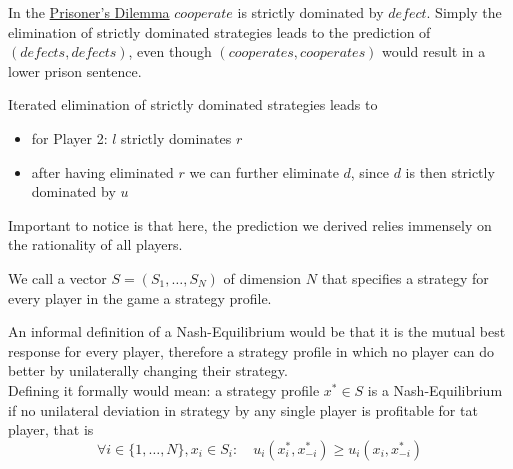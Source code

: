 In the \hyperref[prisonersdilemma]{Prisoner's Dilemma} $cooperate$ is strictly dominated by $defect$. Simply the elimination of strictly dominated strategies leads to the prediction of $(defects, defects)$, even though $(cooperates, cooperates)$ would result in a lower prison sentence.


\begin{example}
	Iterated elimination of strictly dominated strategies leads to
	\begin{itemize}
		\item for Player 2: $l$ strictly dominates $r$
		\item after having eliminated $r$ we can further eliminate $d$, since $d$ is then strictly dominated by $u$
	\end{itemize}
\end{example}

Important to notice is that here, the prediction we derived relies immensely on the rationality of all players.

\begin{definition} \label{strategyprofile} 
	We call a vector $S = (S_{1}, \dotsc, S_{N})$ of dimension $N$ that specifies a strategy for every player in the game a strategy profile.
\end{definition}

\begin{definition} \label{nashequilibrium} 
	An informal definition of a Nash-Equilibrium would be that it is the mutual best response for every player, therefore a strategy profile in which no player can do better by unilaterally changing their strategy. \\
	Defining it formally would mean: a strategy profile $x^{*} \in S$ is a Nash-Equilibrium if no unilateral deviation in strategy by any single player is profitable for tat player, that is
	\[ \forall i \in \{1, \dotsc, N \}, x_{i} \in S_{i}: \quad u_{i}(x_{i}^{*}, x_{-i}^{*}) \geq u_{i}(x_{i}, x_{-i}^{*}) \]
	\end{definition}

